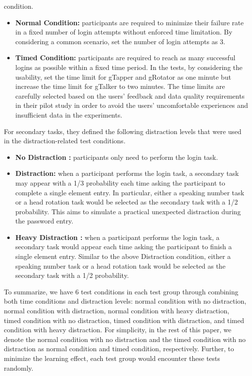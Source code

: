\documentclass[12pt,a4paper,oneside]{report}
\begin{document}
condition.
\begin{itemize}
    \item \textbf{Normal Condition:} participants are required to minimize
their failure rate in a fixed number of login attempts without enforced time limitation. By considering a common
scenario, set the number of login attempts as 3.
\item \textbf{Timed Condition:} participants are required to reach as
many successful logins as possible within a fixed time
period. In the tests, by considering the usability, set
the time limit for gTapper and gRotator as one minute
but increase the time limit for gTalker to two minutes.
The time limits are carefully selected based on the users’
feedback and data quality requirements in their pilot study
in order to avoid the users’ uncomfortable experiences
and insufficient data in the experiments.

\end{itemize}
For secondary tasks, they defined the following distraction
levels that were used in the distraction-related test conditions.

\begin{itemize}
    \item \textbf{No Distraction :} participants only need to perform the
login task.
    \item \textbf{Distraction: } when a participant performs the login task,
a secondary task may appear with a 1/3 probability each
time asking the participant to complete a single element
entry. In particular, either a speaking number task or a
head rotation task would be selected as the secondary task
with a 1/2 probability. This aims to simulate a practical
unexpected distraction during the password entry.
    \item \textbf{Heavy Distraction :} when a participant performs the login
task, a secondary task would appear each time asking the
participant to finish a single element entry. Similar to the
above Distraction condition, either a speaking number
task or a head rotation task would be selected as the
secondary task with a 1/2 probability.
\end{itemize}
To summarize, we have 6 test conditions in each test group
through combining both time conditions and distraction levels:
normal condition with no distraction, normal condition with
distraction, normal condition with heavy distraction, timed
condition with no distraction, timed condition with distraction,
and timed condition with heavy distraction. For simplicity,
in the rest of this paper, we denote the normal condition
with no distraction and the timed condition with no distraction as normal condition and timed condition, respectively.
Further, to minimize the learning effect, each test group
would encounter these tests randomly.
\end{document}
